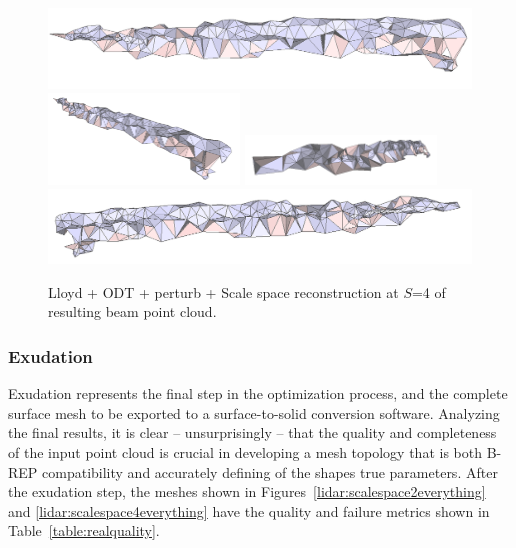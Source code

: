 \documentclass[12pt]{drexelthesis}
\let\Oldsubsubsection\subsubsection
\renewcommand{\subsubsection}{\FloatBarrier\Oldsubsubsection}
\begin{document}
\begin{figure}[!ht]
	\centering
		\includegraphics[width=5in]{real-lab-scans/optimizedNeat/scalespace4perturb00.png}
		\includegraphics[width=2in]{real-lab-scans/optimizedNeat/scalespace4perturb01.png}
		\includegraphics[width=2in]{real-lab-scans/optimizedNeat/scalespace4perturb02.png}
		\includegraphics[width=5in]{real-lab-scans/optimizedNeat/scalespace4perturb03.png}
		\caption[Lloyd + ODT + perturb + Scale space reconstruction at $S$=4 of segmented LiDAR data]{\centering Lloyd + ODT + perturb + Scale space reconstruction at $S$=4 of resulting beam point cloud.}
	\label{lidar:scalespace4perturb}
\end{figure}

\subsubsection{Exudation}

Exudation represents the final step in the optimization process, and the complete surface mesh to be exported to a surface-to-solid conversion software. Analyzing the final results, it is clear -- unsurprisingly -- that the quality and completeness of the input point cloud is crucial in developing a mesh topology that is both B-REP compatibility and accurately defining of the shapes true parameters. After the exudation step, the meshes shown in Figures~\ref{lidar:scalespace2everything} and \ref{lidar:scalespace4everything} have the quality and failure metrics shown in Table~\ref{table:realquality}.
\end{document}
